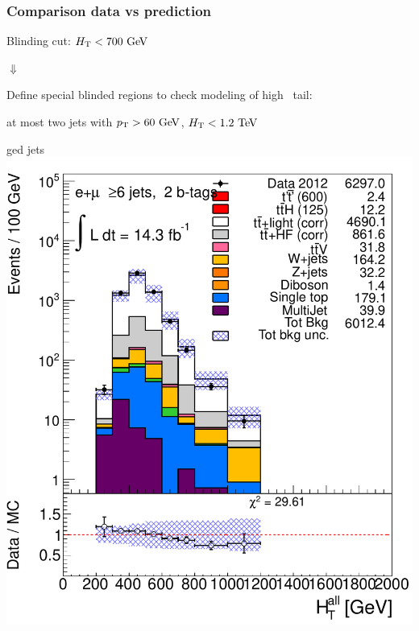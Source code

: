\begin{frame}\frametitle{Comparison data vs prediction}
\centering\scriptsize

Blinding cut: $\HT<700\gev$

{\Large$\Downarrow$}

Define special blinded regions to check modeling of high \HT\ tail:

\myskip

at most two jets with $\pt>60\gev$, $\HT<1.2\tev$

\myskip

\begin{minipage}{.45\textwidth} \btag ged jets\\
\includegraphics[width=.8\textwidth]{pics/htx_httails/HTAll_ELEMUON_6jetin2btagex_NOMINAL_logscale}

\end{minipage}\begin{minipage}{.45\textwidth}\centering


\end{minipage}
\end{frame}

